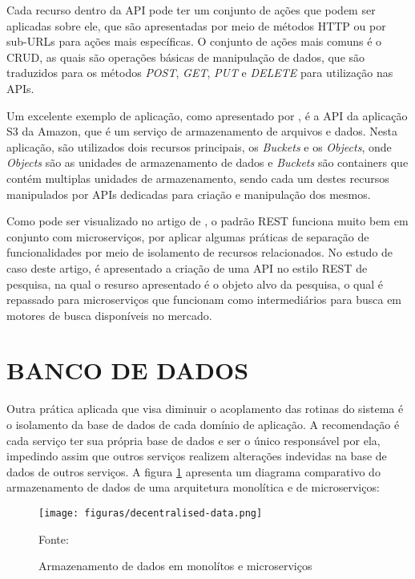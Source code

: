 Cada recurso dentro da \ac{API} pode ter um conjunto de ações que podem ser
aplicadas sobre ele, que são apresentadas por meio de métodos \ac{HTTP} ou
por sub-\ac{URLs} para ações mais específicas. O conjunto de ações mais
comuns é o \ac{CRUD}, as quais são operações básicas de manipulação de dados,
que são traduzidos para os métodos \emph{POST}, \emph{GET}, \emph{PUT} e
\emph{DELETE} para utilização nas \ac{APIs}.

Um excelente exemplo de aplicação, como apresentado por
, é a \ac{API} da aplicação S3 da Amazon, que é
um serviço de armazenamento de arquivos e dados. Nesta aplicação, são
utilizados dois recursos principais, os \emph{Buckets} e os \emph{Objects},
onde \emph{Objects} são as unidades de armazenamento de dados e \emph{Buckets}
são containers que contém multiplas unidades de armazenamento, sendo cada
um destes recursos manipulados por \ac{APIs} dedicadas para criação e
manipulação dos mesmos.

Como pode ser visualizado no artigo de  , o padrão
\ac{REST} funciona muito bem em conjunto com microserviços, por aplicar algumas
práticas de separação de funcionalidades por meio de isolamento de recursos
relacionados. No estudo de caso deste artigo, é apresentado a criação de uma
\ac{API} no estilo \ac{REST} de pesquisa, na qual o resurso apresentado é o
objeto alvo da pesquisa, o qual é repassado para microserviços que funcionam
como intermediários para busca em motores de busca disponíveis no mercado.

\section{BANCO DE DADOS}

Outra prática aplicada que visa diminuir o acoplamento das rotinas do sistema
é o isolamento da base de dados de cada domínio de aplicação. A recomendação é
cada serviço ter sua própria base de dados e ser o único responsável por ela,
impedindo assim que outros serviços realizem alterações indevidas na base de
dados de outros serviços. A figura \ref{fig:db-monolith-microservices}
apresenta um diagrama comparativo do armazenamento de dados de uma arquitetura
monolítica e de microserviços:

\begin{figure}[H]
	\centering
	\caption{Armazenamento de dados em monolítos e microserviços}
	\texttt{[image: figuras/decentralised-data.png]}

	\label{fig:db-monolith-microservices}
	\footnotesize Fonte: 
\end{figure}

